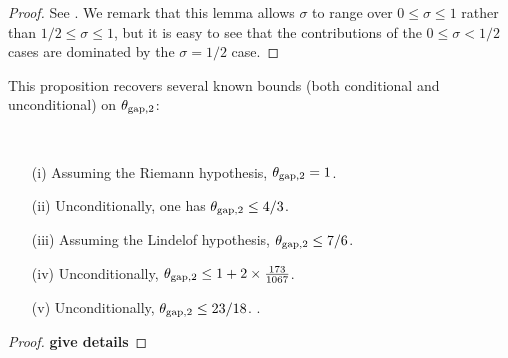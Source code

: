 \begin{proof} See \cite[Lemma 2]{heath_brown_consecutive_II}. We remark that this lemma allows $\sigma$ to range over $0 \leq \sigma \leq 1$ rather than $1/2 \leq \sigma \leq 1$, but it is easy to see that the contributions of the $0 \leq \sigma < 1/2$ cases are dominated by the $\sigma=1/2$ case.
\end{proof}

This proposition recovers several known bounds (both conditional and unconditional) on $\theta_{\mathrm{gap},2}$:

\begin{corollary}\label{primesquare-bounds}\
    \begin{itemize}
    \item[(i)] Assuming the Riemann hypothesis, $\theta_{\mathrm{gap},2} = 1$.  \cite{selberg_1943}
    \item[(ii)] Unconditionally, one has $\theta_{\mathrm{gap},2} \leq 4/3$.  \cite{heath_brown_consecutive_I}
    \item[(iii)] Assuming the Lindelof hypothesis, $\theta_{\mathrm{gap},2} \leq 7/6$. \cite{heath_brown_consecutive_II}
    \item[(iv)] Unconditionally, $\theta_{\mathrm{gap},2} \leq 1 + 2 \times \frac{173}{1067}$. \cite[\S 7]{heath_brown_consecutive_II}
    \item[(v)] Unconditionally, $\theta_{\mathrm{gap},2} \leq 23/18$. \cite[Theorem 12.14]{ivic}.
\end{itemize}
\end{corollary}

\begin{proof} {\bf give details}
\end{proof}
